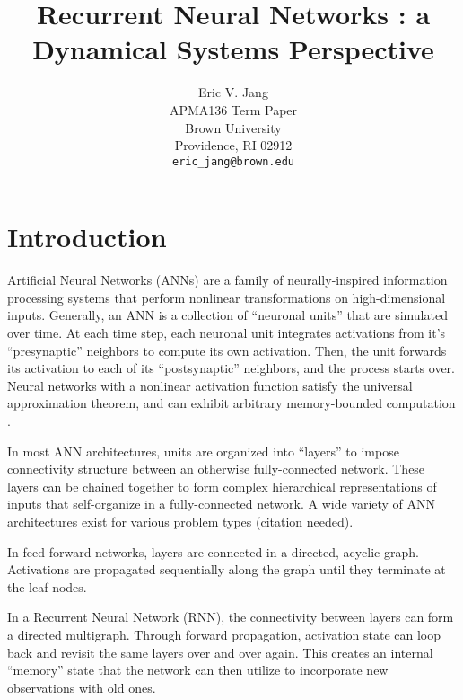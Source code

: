 \documentclass{article} %
\title{Recurrent Neural Networks : a Dynamical Systems Perspective}
\author{
Eric V. Jang \\
APMA136 Term Paper \\
Brown University \\
Providence, RI 02912 \\
\texttt{eric\_jang@brown.edu} \\
}
\begin{document}


\maketitle

\begin{abstract}



\end{abstract}

\section{Introduction} %

Artificial Neural Networks (ANNs) are a family of neurally-inspired information processing systems that perform nonlinear transformations on high-dimensional inputs. Generally, an ANN is a collection of ``neuronal units'' that are simulated over time. At each time step, each neuronal unit integrates activations from it's ``presynaptic'' neighbors to compute its own activation. Then, the unit forwards its activation to each of its ``postsynaptic'' neighbors, and the process starts over. Neural networks with a nonlinear activation function satisfy the universal approximation theorem, and can exhibit arbitrary memory-bounded computation \cite{Hornik1991251}.

In most ANN architectures, units are organized into ``layers'' to impose connectivity structure between an otherwise fully-connected network. These layers can be chained together to form complex hierarchical representations of inputs that self-organize in a fully-connected network. A wide variety of ANN architectures exist for various problem types (citation needed).

In feed-forward networks, layers are connected in a directed, acyclic graph. Activations are propagated sequentially along the graph until they terminate at the leaf nodes.

In a Recurrent Neural Network (RNN), the connectivity between layers can form a directed multigraph. Through forward propagation, activation state can loop back and revisit the same layers over and over again. This creates an internal ``memory'' state that the network can then utilize to incorporate new observations with old ones.
\end{document}
